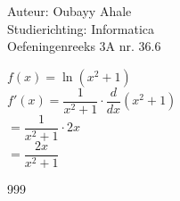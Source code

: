\documentclass[a4paper]{article}
\begin{document}
  
\noindent \large Auteur: Oubayy Ahale          \\
\noindent \large Studierichting: Informatica   \\
\noindent \large Oefeningenreeks 3A nr. 36.6  \\

\medskip

\normalsize

$ f(x) = \ln(x^2 + 1) $\\

$ f'(x) = \dfrac{1}{x^2 + 1} \cdot \dfrac{d}{dx} (x^2 + 1) $\\

$ = \dfrac{1}{x^2 + 1} \cdot 2x $\\

$ = \dfrac{2x}{x^2 + 1} $\\

\begin{thebibliography}{999}
\end{thebibliography}
\end{document}
